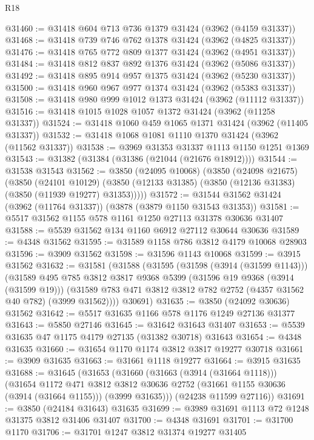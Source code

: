 \begin{lexlean}{R18}
\begin{coremodule}
@31460 := @31418 @604 @713 @736 @1379 @31424 (@3962 (@4159 @31337))
@31468 := @31418 @739 @746 @762 @1378 @31424 (@3962 (@4825 @31337))
@31476 := @31418 @765 @772 @809 @1377 @31424 (@3962 (@4951 @31337))
@31484 := @31418 @812 @837 @892 @1376 @31424 (@3962 (@5086 @31337))
@31492 := @31418 @895 @914 @957 @1375 @31424 (@3962 (@5230 @31337))
@31500 := @31418 @960 @967 @977 @1374 @31424 (@3962 (@5383 @31337))
@31508 := @31418 @980 @999 @1012 @1373 @31424 (@3962 (@11112 @31337))
@31516 := @31418 @1015 @1028 @1057 @1372 @31424 (@3962 (@11258 @31337))
@31524 := @31418 @1060 @459 @1065 @1371 @31424 (@3962 (@11405 @31337))
@31532 := @31418 @1068 @1081 @1110 @1370 @31424 (@3962 (@11562 @31337))
@31538 := @3969 @31353 @31337 @1113 @1150 @1251 @1369
@31543 := @31382 (@31384 (@31386 (@21044 (@21676 @18912))))
@31544 := @31538 @31543
@31562 := @3850
    (@24095 @10068)
    (@3850
      (@24098 @21675)
      (@3850
        (@24101 @10129)
        (@3850 (@12133 @31385) (@3850 (@12136 @31383) (@3850 (@11939 @19277) @31353)))))
@31572 := @31544 @31562 @31424 (@3962 (@11764 @31337)) (@3878 (@3879 @1150 @31543 @31353))
@31581 := @5517 @31562 @1155 @578 @1161 @1250 @27113 @31378 @30636 @31407
@31588 := @5539 @31562 @134 @1160 @6912 @27112 @30644 @30636
@31589 := @4348 @31562
@31595 := @31589 @1158 @786 @3812 @4179 @10068 @28903
@31596 := @3909 @31562
@31598 := @31596 @1143 @10068
@31599 := @3915 @31562
@31632 := @31581
    (@31588
      (@31595
        (@31598 (@3914 (@31599 @1143)))
        (@31589
          @495
          @785
          @3812
          @3817
          @9368
          @5399
          (@31596 @19 @9368 (@3914 (@31599 @19)))
          (@31589 @783 @471 @3812 @3812 @782 @2752 (@4357 @31562 @40 @782) (@3999 @31562))))
      @30691)
@31635 := @3850 (@24092 @30636) @31562
@31642 := @5517 @31635 @1166 @578 @1176 @1249 @27136 @31377
@31643 := @5850 @27146
@31645 := @31642 @31643 @31407
@31653 := @5539 @31635 @47 @1175 @4179 @27135 (@31382 @30718) @31643
@31654 := @4348 @31635
@31660 := @31654 @1170 @1174 @3812 @3817 @19277 @30718
@31661 := @3909 @31635
@31663 := @31661 @1118 @19277
@31664 := @3915 @31635
@31688 := @31645
    (@31653
      (@31660
        (@31663 (@3914 (@31664 @1118)))
        (@31654
          @1172
          @471
          @3812
          @3812
          @30636
          @2752
          (@31661 @1155 @30636 (@3914 (@31664 @1155)))
          (@3999 @31635)))
      (@24238 @11599 @27116))
@31691 := @3850 (@24184 @31643) @31635
@31699 := @3989 @31691 @1113 @72 @1248 @31375 @3812 @31406 @31407
@31700 := @4348 @31691
@31701 := @31700 @1170
@31706 := @31701 @1247 @3812 @31374 @19277 @31405

\end{coremodule}
\end{lexlean}
